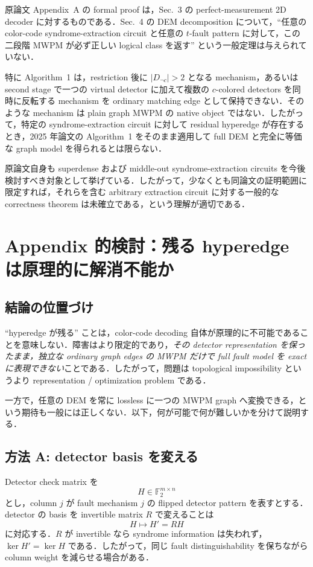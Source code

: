 \documentclass[a4paper,11pt]{ltjsarticle}
\newcommand{\F}{\mathbb{F}_2}
\newcommand{\kerop}{\operatorname{ker}}
\begin{document}
原論文 Appendix~A の formal proof は，Sec.~3 の perfect-measurement 2D decoder に対するものである．Sec.~4 の DEM decomposition について，``任意の color-code syndrome-extraction circuit と任意の $t$-fault pattern に対して，この二段階 MWPM が必ず正しい logical class を返す'' という一般定理は与えられていない．

特に Algorithm~1 は，restriction 後に $|D_{\neg c}|>2$ となる mechanism，あるいは second stage で一つの virtual detector に加えて複数の $c$-colored detectors を同時に反転する mechanism を ordinary matching edge として保持できない．そのような mechanism は plain graph MWPM の native object ではない．したがって，特定の syndrome-extraction circuit に対して residual hyperedge が存在するとき，2025 年論文の Algorithm~1 をそのまま適用して full DEM と完全に等価な graph model を得られるとは限らない．

原論文自身も superdense および middle-out syndrome-extraction circuits を今後検討すべき対象として挙げている．したがって，少なくとも同論文の証明範囲に限定すれば，それらを含む arbitrary extraction circuit に対する一般的な correctness theorem は未確立である，という理解が適切である．

\section{Appendix 的検討：残る hyperedge は原理的に解消不能か}
\subsection{結論の位置づけ}

``hyperedge が残る'' ことは，color-code decoding 自体が原理的に不可能であることを意味しない．障害はより限定的であり，\emph{その detector representation を保ったまま，独立な ordinary graph edges の MWPM だけで full fault model を exact に表現できない}ことである．したがって，問題は topological impossibility というより representation / optimization problem である．

一方で，任意の DEM を常に lossless に一つの MWPM graph へ変換できる，という期待も一般には正しくない．以下，何が可能で何が難しいかを分けて説明する．

\subsection{方法 A: detector basis を変える}

Detector check matrix を
\begin{equation}
 H\in\F^{m\times n}
\end{equation}
とし，column $j$ が fault mechanism $j$ の flipped detector pattern を表すとする．detector の basis を invertible matrix $R$ で変えることは
\begin{equation}
  H\mapsto H'=RH
  \label{eq:row-transform}
\end{equation}
に対応する．$R$ が invertible なら syndrome information は失われず，$\kerop H'=\kerop H$ である．したがって，同じ fault distinguishability を保ちながら column weight を減らせる場合がある．
\end{document}
